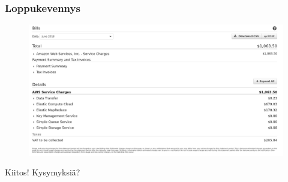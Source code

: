 \documentclass{beamer}
\begin{document}
\begin{frame}
\frametitle{Loppukevennys}

\begin{figure}[h]
	\centering
	\includegraphics[scale=0.2]{../images/aws_bill}
\end{figure}

\end{frame}


\begin{frame}

Kiitos! Kysymyksiä?

\end{frame}

\end{document}
